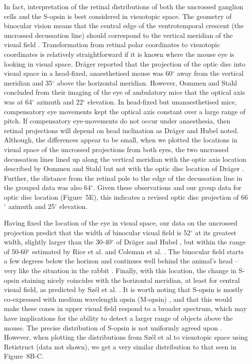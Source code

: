 \documentclass[10pt]{article}
\newcounter{Figure}
\begin{document}
In fact, interpretation of the retinal distributions of both the
uncrossed ganglion cells and the S-opsin is best considered in
visuotopic space. The geometry of binocular vision means that the
central edge of the ventrotemporal crescent (the uncrossed
decussation line) should correspond to the vertical meridian of the
visual field \cite{DragerOlsen1980,ColemanEtal2009}.
Transformation from retinal polar coordinates to visuotopic
coordinates is relatively straightforward if it is known where the
mouse eye is looking in visual space. Dr\"ager \cite{Drager1978} reported
that the projection of the optic disc into visual space in a
head-fixed, anaesthetised mouse was 60$^{\circ}$ away from the vertical
meridian and 35$^{\circ}$ above the horizontal meridian.  However, Oommen
and Stahl \cite{OommenStahl2008} concluded from their imaging of the
eye of ambulatory mice that the optical axis was at 64$^{\circ}$ azimuth
and 22$^{\circ}$ elevation. In head-fixed but unanaesthetised mice,
compensatory eye movements kept the optical axis constant over a
large range of pitch. If compensatory eye-movements do not occur
under anaesthesia, then retinal projections will depend on head
inclination as Dr\"ager and Hubel \cite{DragerHubel1976} noted.
Although, the differences appear to be small, when we plotted the
locations in visual space of the uncrossed projections from both
eyes, the two uncrossed decussation lines lined up along the vertical
meridian with the optic axis location described by Oommen and Stahl \cite{OommenStahl2008} but not with the optic disc location of
Dr\"ager \cite{Drager1978}. Further, the distance from the retinal pole to
the edge of the decussation line in the grouped data was also
64$^{\circ}$. Given these observations and our group data for optic disc
location (Figure~5E), this indicates a revised optic disc projection
of 66$^{\circ}$ azimuth and 25$^{\circ}$ elevation. 

Having fixed the location of the eye in visual space, our data on the
uncrossed projection predict that the width of binocular visual field
is 52$^{\circ}$ at its greatest width, slightly larger than the
30-40$^{\circ}$ of Dr\"ager and Hubel \cite{DragerHubel1976}, but within
the range of 50-60$^{\circ}$ estimated by Rice et al. \cite{RiceEtal1995}
and Coleman et al. \cite{ColemanEtal2009}. The binocular field starts
a few degrees below the horizon and continues well behind the
animal's head -- very like the situation in the rabbit \cite{Hughes1971}.
Finally, with this location, the change in S-opsin staining nicely
coincides with the horizontal meridian, at least for central visual
field, as predicted by Sz\'el et al. \cite{SzelEtal1992}. It is worth
noting that S-opsin is mostly co-expressed with medium wavelength
opsin (M-opsin) \cite{HaverkampEtal2005,AppleburyEtal2000}, and
that this would make these cones in upper visual field respond to a
broader spectrum, which may have implications for the ability to
detect a larger range of objects above the mouse. The precise
distribution of S-opsin is not uniformly agreed upon \cite{HaverkampEtal2005,AppleburyEtal2000,SzelEtal1992}. However, when
plotting the distributions from Sz\'el et al \cite{SzelEtal1992} to
visuotopic space using Retistruct (data not shown), we get a very
similar distribution to that seen in Figure~8B-C. 
\end{document}
